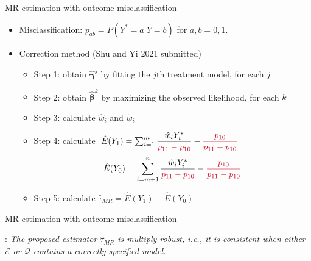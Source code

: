 \documentclass[12pt,aspectratio=169]{beamer}
\begin{document}
\begin{frame}{MR estimation with  outcome misclassification}
\begin{itemize}
\item 

{\color{cred}Misclassification}: $p_{ab}=P(Y^\ast=a|Y=b)$  for $a, b=0, 1$.



\item Correction method (Shu and Yi 2021 submitted)

\begin{itemize}
\item 

Step 1: obtain $\hat{\boldsymbol\gamma}^j$ by fitting the $j$th treatment model,  for each $j$

\item \colorbox{blue!10}{Step 2}: obtain $\hat{\boldsymbol\beta}^k$ by maximizing the {\color{cred}observed} likelihood,  for each $k$ 

\item Step 3: calculate  $\hat w_i$  and  $\tilde w_i$

\item \colorbox{blue!10}{Step 4}:  calculate
$
\,\, \hat E(Y_1)=\sum_{i=1}^m \dfrac {\hat w_iY_i^\ast}{{\color{cred}p_{11}-p_{10}}}-{\color{cred}\dfrac{p_{10}}{p_{11}-p_{10}}}
$
\[
\hat E(Y_0)=\sum_{i=m+1}^{n}   \dfrac {\tilde w_i Y_i^\ast}{{\color{cred} p_{11}-p_{10}}}-{\color{cred}\dfrac{p_{10}}{p_{11}-p_{10}}}
\]

\item Step 5:  calculate $\hat\tau_{MR}=\hat E(Y_1)-\hat E(Y_0)$

\end{itemize}


\end{itemize}

\end{frame}





\begin{frame}{MR estimation with  outcome misclassification}


\begin{block}
:
{\it
The proposed estimator $\hat\tau_{MR}$ is {\color{cred}multiply robust}, i.e., it is {\color{cred}consistent} when either {\color{cred}$\mathcal{E}$ or $\mathcal{Q}$ contains a correctly} specified model.
}
\end{block}


 \vfill
{\color{black!40}{\scriptsize Shu D, Yi GY. Multiply robust estimation of causal treatment effects with binary outcome data subject to misclassification. Submitted.}}
\end{frame}
\end{document}
